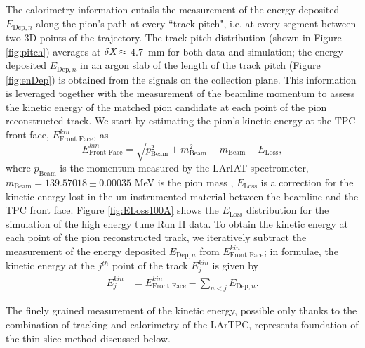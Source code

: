 \documentclass[aps,prl,twocolumn,showpacs,superscriptaddress,groupedaddress]{revtex4}  %
\begin{document}
The calorimetry information entails the measurement of the energy deposited $E_{\text{Dep},n}$ along the pion's path at every ``track pitch", i.e. at every segment between two 3D points of the trajectory. The track pitch distribution (shown in Figure \ref{fig:pitch}) averages at $\delta {\emph{X}} \approx$ 4.7~mm for both data and simulation;  the energy deposited $E_{\text{Dep},n}$ in an argon slab of the length of the track pitch (Figure \ref{fig:enDep}) is obtained from the signals on the collection plane.  This information is leveraged together with the measurement of the beamline momentum to assess the kinetic energy of the matched pion candidate at each point of the pion reconstructed track. We start by estimating the pion's  kinetic energy at the TPC front face, $ E^{kin}_{\text{Front Face}}$, as 
\begin{equation}
 E^{kin}_{\text{Front Face}}  =  \sqrt{p^2_{\text{Beam}} + m^2_{\text{Beam}}} - m_{\text{Beam}} - E_{\text{Loss}},
\label{eq:enFF}
\end{equation}
where $p_{\text{Beam}}$ is the momentum measured by the LArIAT spectrometer, $m_{\text{Beam}} = 139.57018\pm0.00035$ MeV is the pion mass \cite{Patrignani:2016xqp}, $E_{\text{Loss}}$ is a correction for the kinetic energy lost in the un-instrumented material between the beamline and the TPC front face. Figure \ref{fig:ELoss100A} shows the $E_{\text{Loss}}$ distribution for the simulation of the high energy tune Run II data. To obtain the kinetic energy at each point of the pion reconstructed track, we iteratively subtract the measurement of the energy deposited $E_{\text{Dep},n}$ from $ E^{kin}_{\text{Front Face}}$; in formulae, the kinetic energy at the $j^{th}$ point of the track  $E_{j}^{kin}$ is given by
\begin{equation}
\begin{split}
 E_{j}^{kin}  & = E^{kin}_{\text{Front Face}} -  \sum_{n < j} E_{\text{Dep},n}.
\end{split}
\label{eq:KEj}
\end{equation}

The finely grained measurement of the kinetic energy, possible only thanks to the combination of tracking and calorimetry of the LArTPC, represents foundation of the thin slice method discussed below.\\
\end{document}
